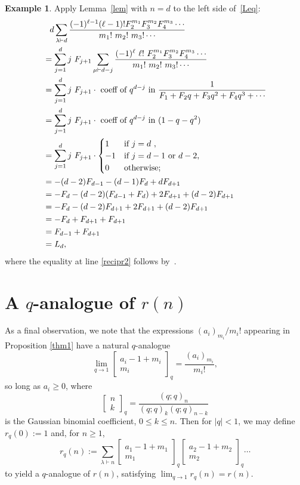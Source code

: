 \documentclass[10pt]{article}
\theoremstyle{definition}
\newtheorem{example}[theorem]{Example}
\newcommand\qbin[3]{\left[ \begin{matrix} #1 \\ #2 \end{matrix}
                   \right]_{\displaystyle #3}}
\numberwithin{theorem}{section}
\numberwithin{equation}{section}
\begin{document}
\begin{example}
Apply Lemma~\ref{lem} with $n = d$ to the left side of~\eqref{Leq}:
 \begin{align}
&  \phantom{ = }d\sum_{\lambda\vdash d} \frac{(-1)^{\ell - 1} (\ell - 1)!  F_2^{m_1} F_3^{m_2} F_4^{m_3} \cdots}
 {m_1! \ m_2! \ m_3! \cdots } \notag \\ & =
 \sum_{j=1}^d j \ F_{j+1} \sum_{\mu \vdash d-j} \frac{(-1)^\ell \ \ell! \ F_2^{m_1} 
 F_3^{m_2} F_4^{m_3} \cdots}{m_1! \ m_2! \ m_3! \cdots } \notag \\
 & = \sum_{j=1}^d j \ F_{j+1} \cdot \mbox{ coeff of } q^{d-j} \mbox{ in }\frac{1}
 {F_1 + F_2 q + F_3 q^2 + F_4 q^3 + \cdots}  \label{recipr2} \\
 & = \sum_{j=1}^d j \ F_{j+1} \cdot \mbox{ coeff of } q^{d-j} \mbox{ in } (1-q-q^2) \notag \\
 & = \sum_{j=1}^d j \ F_{j+1} \cdot \begin{cases}  
  1 &\mbox{if $j = d$ }, \\
  -1 &\mbox{if $j =d-1$ or $d-2$, }\\
  0  &\mbox{otherwise; }
\end{cases}
 \notag\\
 & = -(d-2)F_{d-1} - (d-1)F_d + d F_{d+1}\notag \\
 & = -F_d - (d-2)(F_{d-1} + F_d) + 2 F_{d+1} + (d-2)F_{d+1} \notag \\
 & = -F_d - (d-2)F_{d+1} + 2F_{d+1} + (d-2)F_{d+1} \notag \\
 & = -F_d + F_{d+1} + F_{d+1} \notag \\
 & = F_{d-1} + F_{d+1} \notag \\
 & = L_d, \notag
 \end{align}
where the equality at line \eqref{recipr2} follows by~\cite[p. 3, Lemma 1]{ss22}.

\end{example}


\section{A $q$-analogue of $r(n)$}

As a final observation, we note that the expressions $(a_i)_{m_{i}}/{m_i!}$ appearing in Proposition \ref{thm1} have a natural $q$-analogue
$$ \lim_{q \to 1} \qbin{a_i - 1 + m_i}{m_i}{q} = \frac{(a_i)_{m_i}}{m_i!},$$
so long as $a_i\geq 0$, where
$$ \qbin{n}{k}{q} = \frac{(q;q)_n}{(q;q)_k(q;q)_{n-k}} $$
is the Gaussian binomial coefficient, $0\leq k\leq n$. Then for $|q|<1$, we may define $r_q(0):=1$ and, for $n\geq 1$, 
$$ r_q(n) := \sum_{\lambda \vdash n} \qbin{a_1 - 1 + m_1}{m_1}{q} \qbin{a_2 - 1 + m_2}{m_2}{q} \cdots $$
to yield a $q$-analogue of $r(n)$, satisfying $\lim_{q \to 1} r_q(n) = r(n)$. 
\end{document}
